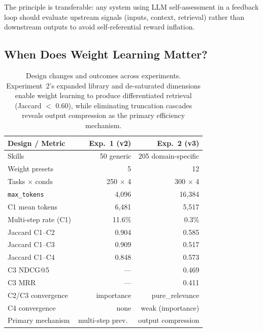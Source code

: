 The principle is transferable: any system using LLM self-assessment in a feedback loop should evaluate upstream signals (inputs, context, retrieval) rather than downstream outputs to avoid self-referential reward inflation.

\subsection{When Does Weight Learning Matter?}

\begin{table}[t]
\centering
\small
\begin{tabular}{lrr}
\toprule
\textbf{Design / Metric} & \textbf{Exp.~1 (v2)} & \textbf{Exp.~2 (v3)} \\
\midrule
Skills              & 50 generic      & 205 domain-specific \\
Weight presets      & 5               & 12 \\
Tasks $\times$ conds & 250 $\times$ 4 & 300 $\times$ 4 \\
\texttt{max\_tokens} & 4{,}096        & 16{,}384 \\
\midrule
C1 mean tokens      & 6{,}481        & 5{,}517 \\
Multi-step rate (C1) & 11.6\%         & 0.3\% \\
\midrule
Jaccard C1--C2      & 0.904           & 0.585 \\
Jaccard C1--C3      & 0.909           & 0.517 \\
Jaccard C1--C4      & 0.848           & 0.573 \\
C3 NDCG@5           & ---             & 0.469 \\
C3 MRR              & ---             & 0.411 \\
\midrule
C2/C3 convergence   & importance      & pure\_relevance \\
C4 convergence      & none            & weak (importance) \\
Primary mechanism   & multi-step prev.\ & output compression \\
\bottomrule
\end{tabular}
\caption{Design changes and outcomes across experiments. Experiment~2's expanded library and de-saturated dimensions enable weight learning to produce differentiated retrieval (Jaccard $<$ 0.60), while eliminating truncation cascades reveals output compression as the primary efficiency mechanism.}
\label{tab:v2v3_comparison}
\end{table}


